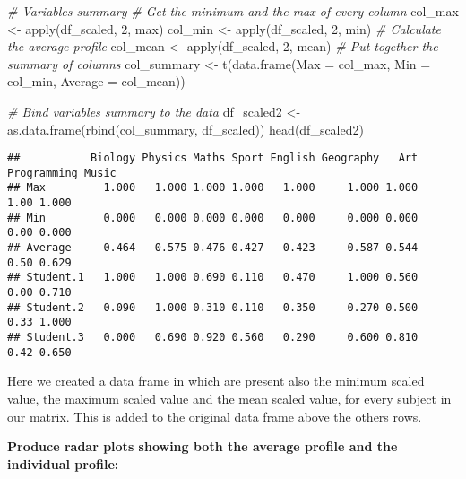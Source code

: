 \documentclass[
]{article}
\newenvironment{Shaded}{\begin{snugshade}}{\end{snugshade}}
\newcommand{\AttributeTok}[1]{\textcolor[rgb]{0.77,0.63,0.00}{#1}}
\newcommand{\CommentTok}[1]{\textcolor[rgb]{0.56,0.35,0.01}{\textit{#1}}}
\newcommand{\DecValTok}[1]{\textcolor[rgb]{0.00,0.00,0.81}{#1}}
\newcommand{\FunctionTok}[1]{\textcolor[rgb]{0.00,0.00,0.00}{#1}}
\newcommand{\NormalTok}[1]{#1}
\newcommand{\OtherTok}[1]{\textcolor[rgb]{0.56,0.35,0.01}{#1}}
\begin{document}
\begin{Shaded}
\begin{Highlighting}[]
\CommentTok{\# Variables summary}
\CommentTok{\# Get the minimum and the max of every column  }
\NormalTok{col\_max }\OtherTok{\textless{}{-}} \FunctionTok{apply}\NormalTok{(df\_scaled, }\DecValTok{2}\NormalTok{, max)}
\NormalTok{col\_min }\OtherTok{\textless{}{-}} \FunctionTok{apply}\NormalTok{(df\_scaled, }\DecValTok{2}\NormalTok{, min)}
\CommentTok{\# Calculate the average profile }
\NormalTok{col\_mean }\OtherTok{\textless{}{-}} \FunctionTok{apply}\NormalTok{(df\_scaled, }\DecValTok{2}\NormalTok{, mean)}
\CommentTok{\# Put together the summary of columns}
\NormalTok{col\_summary }\OtherTok{\textless{}{-}} \FunctionTok{t}\NormalTok{(}\FunctionTok{data.frame}\NormalTok{(}\AttributeTok{Max =}\NormalTok{ col\_max, }\AttributeTok{Min =}\NormalTok{ col\_min, }\AttributeTok{Average =}\NormalTok{ col\_mean))}


\CommentTok{\# Bind variables summary to the data}
\NormalTok{df\_scaled2 }\OtherTok{\textless{}{-}} \FunctionTok{as.data.frame}\NormalTok{(}\FunctionTok{rbind}\NormalTok{(col\_summary, df\_scaled))}
\FunctionTok{head}\NormalTok{(df\_scaled2)}
\end{Highlighting}
\end{Shaded}

\begin{verbatim}
##           Biology Physics Maths Sport English Geography   Art Programming Music
## Max         1.000   1.000 1.000 1.000   1.000     1.000 1.000        1.00 1.000
## Min         0.000   0.000 0.000 0.000   0.000     0.000 0.000        0.00 0.000
## Average     0.464   0.575 0.476 0.427   0.423     0.587 0.544        0.50 0.629
## Student.1   1.000   1.000 0.690 0.110   0.470     1.000 0.560        0.00 0.710
## Student.2   0.090   1.000 0.310 0.110   0.350     0.270 0.500        0.33 1.000
## Student.3   0.000   0.690 0.920 0.560   0.290     0.600 0.810        0.42 0.650
\end{verbatim}

Here we created a data frame in which are present also the minimum
scaled value, the maximum scaled value and the mean scaled value, for
every subject in our matrix. This is added to the original data frame
above the others rows.

\textbf{Produce radar plots showing both the average profile and the
individual profile:}
\end{document}
